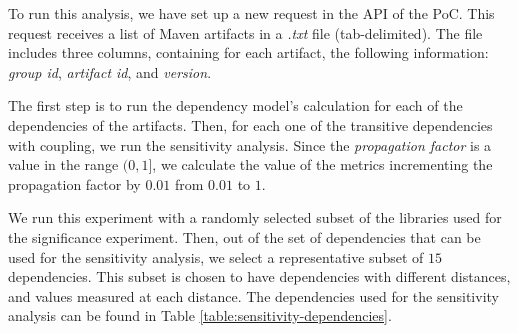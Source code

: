 To run this analysis, we have set up a new request in the API of the PoC. This request receives a list of Maven artifacts in a \textit{.txt} file (tab-delimited). The file includes three columns, containing for each artifact, the following information: \textit{group id}, \textit{artifact id}, and \textit{version}.

The first step is to run the dependency model's calculation for each of the dependencies of the artifacts. Then, for each one of the transitive dependencies with coupling, we run the sensitivity analysis. Since the \textit{propagation factor} is a value in the range $(0,1]$, we calculate the value of the metrics incrementing the propagation factor by $0.01$ from $0.01$ to $1$.

We run this experiment with a randomly selected subset of the libraries used for the significance experiment. Then, out of the set of dependencies that can be used for the sensitivity analysis, we select a representative subset of $15$ dependencies. This subset is chosen to have dependencies with different distances, and values measured at each distance. The dependencies used for the sensitivity analysis can be found in Table \ref{table:sensitivity-dependencies}.

